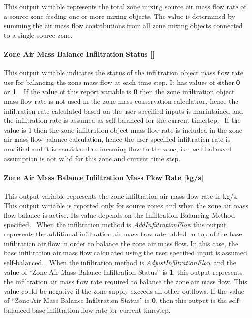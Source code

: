 This output variable represents the total zone mixing source air mass flow rate of a source zone feeding one or more mixing objects. The value is determined by summing the air mass flow contributions from all zone mixing objects connected to a single source zone.

\paragraph{Zone Air Mass Balance Infiltration Status {[]}}\label{zone-air-mass-balance-infiltration-status}

This output variable indicates the status of the infiltration object mass flow rate use for balancing the zone mass flow at each time step. It has values of either \textbf{0} or \textbf{1}.~ If the value of this report variable is \textbf{0} then the zone infiltration object mass flow rate is not used in the zone mass conservation calculation, hence the infiltration rate calculated based on the user specified inputs is manintained and the infiltration rate is assumed as self-balanced for the current timestep.~ If the value is 1 then the zone infiltration object mass flow rate is included in the zone air mass flow balance calculation, hence the user specified infiltration rate is modified and it is considered as incoming flow to the zone, i.e., self-balanced assumption is not valid for this zone and current time step.

\paragraph{Zone Air Mass Balance Infiltration Mass Flow Rate {[}kg/s{]}}\label{zone-air-mass-balance-infiltration-mass-flow-rate-kgs}

This output variable represents the zone infiltration air mass flow rate in kg/s.~ This output variable is reported only for source zones and when the zone air mass flow balance is active. Its value depends on the Infiltration Balancing Method specified.~ When the infiltration method is \emph{AddInfiltrationFlow} this output represents the additional infiltration air mass flow rate added on top of the base infiltration air flow in order to balance the zone air mass flow. In this case, the base infiltration air mass flow calculated using the user specified input is assumed self-balanced.~ When the infiltration method is \emph{AdjustInfiltrationFlow} and the value of ``Zone Air Mass Balance Infiltration Status'' is \textbf{1}, this output represents the infiltration air mass flow rate required to balance the zone air mass flow. This value could be negative if the zone supply exceeds all other outflows. If the value of ``Zone Air Mass Balance Infiltration Status'' is \textbf{0}, then this output is the self-balanced base infiltration flow rate for current timestep.
